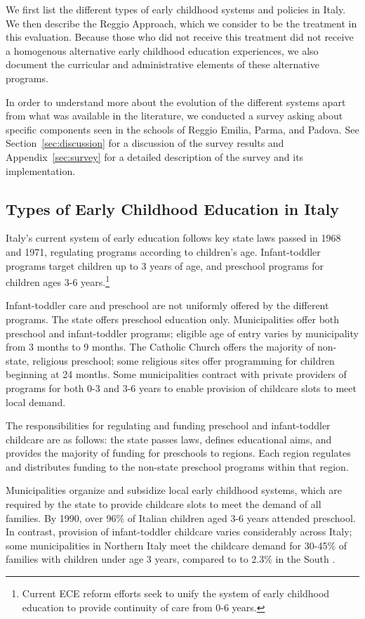 We first list the different types of early childhood systems and policies in Italy. We then describe the Reggio Approach, which we consider to be the treatment in this evaluation. Because those who did not receive this treatment did not receive a homogenous alternative early childhood education experiences, we also document the curricular and administrative elements of these alternative programs. 

In order to understand more about the evolution of the different systems apart from what was available in the literature, we conducted a survey asking about specific components seen in the schools of Reggio Emilia, Parma, and Padova. See Section~\ref{sec:discussion} for a discussion of the survey results and Appendix~\ref{sec:survey} for a detailed description of the survey and its implementation.

\subsection{Types of Early Childhood Education in Italy}

Italy's current system of early education follows key state laws passed in 1968 and 1971, regulating programs according to children's age. Infant-toddler programs target children up to 3 years of age, and preschool programs for children ages 3-6 years.\footnote{Current ECE reform efforts seek to unify the system of early childhood education to provide continuity of care from 0-6 years.} 

Infant-toddler care and preschool are not uniformly offered by the different programs. The state offers preschool education only. Municipalities offer both preschool and infant-toddler programs; eligible age of entry varies by municipality from 3 months to 9 months. The Catholic Church offers the majority of non-state, religious preschool; some religious sites offer programming for children beginning at 24 months. Some municipalities contract with private providers of programs for both 0-3 and 3-6 years to enable provision of childcare slots to meet local demand.

The responsibilities for regulating and funding preschool and infant-toddler childcare are as follows: the state passes laws, defines educational aims, and provides the majority of funding for preschools to regions. Each region regulates and distributes funding to the non-state preschool programs within that region. 

Municipalities organize and subsidize local early childhood systems, which are required by the state to provide childcare slots to meet the demand of all families. By 1990, over 96\% of Italian children aged 3-6 years attended preschool. In contrast, provision of infant-toddler childcare varies considerably across Italy; some municipalities in Northern Italy meet the childcare demand for 30-45\% of families with children under age 3 years, compared to to 2.3\% in the South \citep{Becchi-Ferrari_1990_Pub-Inf-Centres-Italy,Musatti-Picchio_2010_IJEC}. 

